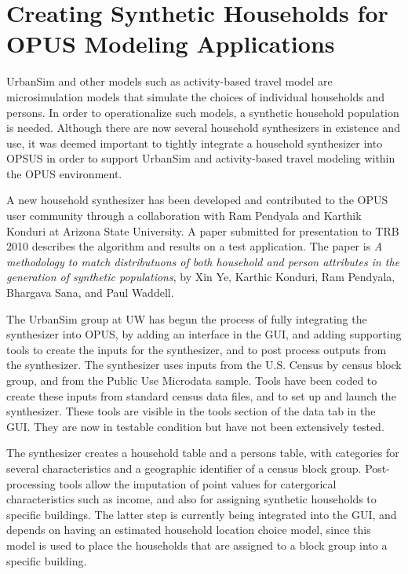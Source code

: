 \chapter{Creating Synthetic Households for OPUS Modeling Applications}

UrbanSim and other models such as activity-based travel model are microsimulation models that simulate the choices of individual households and persons.  In order to operationalize such models, a synthetic household population is needed.  Although there are now several household synthesizers in existence and use, it was deemed important to tightly integrate a household synthesizer into OPSUS in order to support UrbanSim and activity-based travel modeling within the OPUS environment.

A new household synthesizer has been developed and contributed to the OPUS user community through a collaboration with Ram Pendyala and Karthik Konduri at Arizona State University.  A paper submitted for presentation to TRB 2010 describes the algorithm and results on a test application. The paper is \emph{A methodology to match distributuons of both household and person attributes in the generation of synthetic populations}, by Xin Ye, Karthic Konduri, Ram Pendyala, Bhargava Sana, and Paul Waddell. 

The UrbanSim group at UW has begun the process of fully integrating the synthesizer into OPUS, by adding an interface in the GUI, and adding supporting tools to create the inputs for the synthesizer, and to post process outputs from the synthesizer.  The synthesizer uses inputs from the U.S. Census by census block group, and from the Public Use Microdata sample.  Tools have been coded to create these inputs from standard census data files, and to set up and launch the synthesizer.  These tools are visible in the tools section of the data tab in the GUI.  They are now in testable condition but have not been extensively tested.

The synthesizer creates a household table and a persons table, with categories for several characteristics and a geographic identifier of a census block group.  Post-processing tools allow the imputation of point values for catergorical characteristics such as income, and also for assigning synthetic households to specific buildings.  The latter step is currently being integrated into the GUI, and depends on having an estimated household location choice model, since this model is used to place the households that are assigned to a block group into a specific building.

